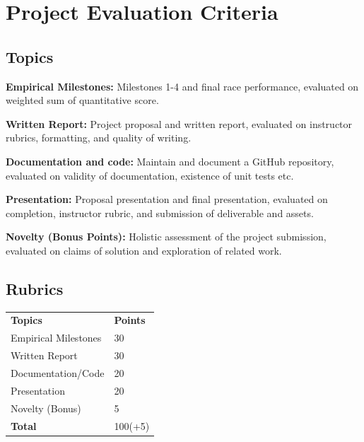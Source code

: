 \documentclass[letta4 paper]{article}
\numberwithin{equation}{section}
\newcommand{\0}{\mathbf{0}}
\begin{document}
	\section{Project Evaluation Criteria}
	\subsection{Topics}
	\textbf{Empirical Milestones:} Milestones 1-4 and final race performance, evaluated on weighted sum of quantitative score.
	
	\noindent\textbf{Written Report:} Project proposal and written report, evaluated on instructor rubrics, formatting, and quality of writing.
	
	\noindent\textbf{Documentation and code:} Maintain and document a GitHub repository, evaluated on validity of documentation, existence of unit tests etc.
	
	\noindent\textbf{Presentation:} Proposal presentation and final presentation, evaluated on completion, instructor rubric, and submission of deliverable and assets.
	
	\noindent\textbf{Novelty (Bonus Points):} Holistic assessment of the project submission, evaluated on claims of solution and exploration of related work.
	\subsection{Rubrics}
	\begin{table}[h]
		\begin{tabular}{ll}
			\textbf{Topics} & \textbf{Points} \\
			Empirical Milestones &	30 \\
			Written Report &	30 \\
			Documentation/Code &	20 \\
			Presentation &	20 \\
			Novelty (Bonus) &	5 \\
			\textbf{Total} & 100(+5) \\
		\end{tabular}
	\end{table}
	

	
			
\end{document}
